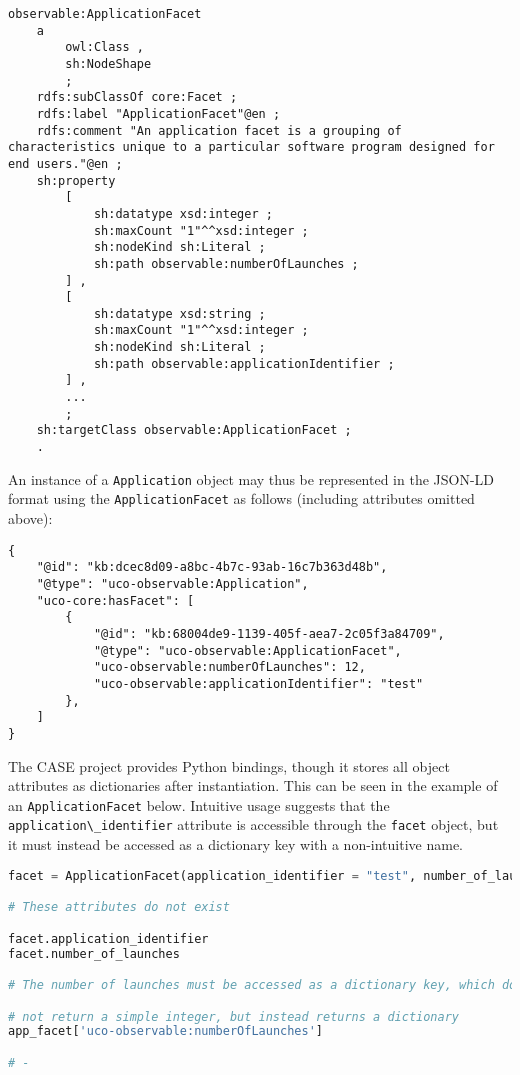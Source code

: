 \documentclass[letterpaper,12pt]{report}
\newcommand{\passthrough}[1]{#1}
\begin{document}
\begin{lstlisting}
observable:ApplicationFacet
    a
        owl:Class ,
        sh:NodeShape
        ;
    rdfs:subClassOf core:Facet ;
    rdfs:label "ApplicationFacet"@en ;
    rdfs:comment "An application facet is a grouping of characteristics unique to a particular software program designed for end users."@en ;
    sh:property
        [
            sh:datatype xsd:integer ;
            sh:maxCount "1"^^xsd:integer ;
            sh:nodeKind sh:Literal ;
            sh:path observable:numberOfLaunches ;
        ] ,
        [
            sh:datatype xsd:string ;
            sh:maxCount "1"^^xsd:integer ;
            sh:nodeKind sh:Literal ;
            sh:path observable:applicationIdentifier ;
        ] ,
        ...
        ;
    sh:targetClass observable:ApplicationFacet ;
    .
\end{lstlisting}

An instance of a \passthrough{\lstinline!Application!} object may thus
be represented in the JSON-LD format using the
\passthrough{\lstinline!ApplicationFacet!} as follows (including
attributes omitted above):

\begin{lstlisting}
{
    "@id": "kb:dcec8d09-a8bc-4b7c-93ab-16c7b363d48b",
    "@type": "uco-observable:Application",
    "uco-core:hasFacet": [
        {
            "@id": "kb:68004de9-1139-405f-aea7-2c05f3a84709",
            "@type": "uco-observable:ApplicationFacet",
            "uco-observable:numberOfLaunches": 12,
            "uco-observable:applicationIdentifier": "test"
        },
    ]
}
\end{lstlisting}

The CASE project provides Python bindings, though it stores all object
attributes as dictionaries after instantiation. This can be seen in the
example of an \passthrough{\lstinline!ApplicationFacet!} below.
Intuitive usage suggests that the
\passthrough{\lstinline!application\_identifier!} attribute is
accessible through the \passthrough{\lstinline!facet!} object, but it
must instead be accessed as a dictionary key with a non-intuitive name.

\begin{lstlisting}[language=Python]
facet = ApplicationFacet(application_identifier = "test", number_of_launches=3)

# These attributes do not exist

facet.application_identifier
facet.number_of_launches

# The number of launches must be accessed as a dictionary key, which does

# not return a simple integer, but instead returns a dictionary
app_facet['uco-observable:numberOfLaunches']

# -
\end{lstlisting}
\end{document}

